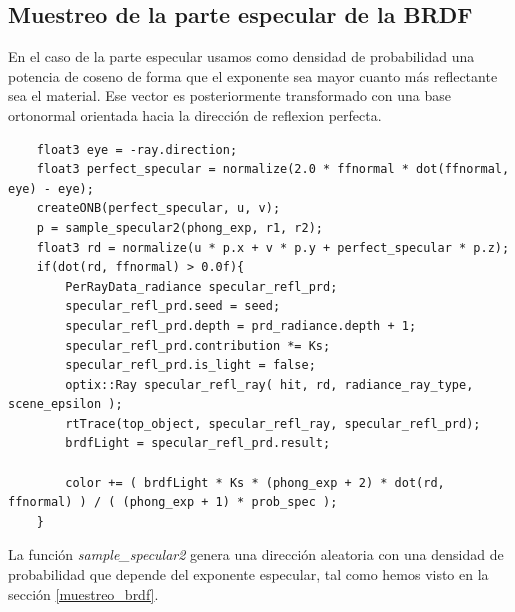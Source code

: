 \clearpage

\subsection{Muestreo de la parte especular de la BRDF}

En el caso de la parte especular usamos como densidad de probabilidad una potencia de coseno de forma que el exponente sea mayor cuanto más reflectante sea el material. Ese vector es posteriormente transformado con una base ortonormal orientada hacia la dirección de reflexion perfecta.

\begin{lstlisting}
	float3 eye = -ray.direction;
	float3 perfect_specular = normalize(2.0 * ffnormal * dot(ffnormal, eye) - eye);
	createONB(perfect_specular, u, v);
	p = sample_specular2(phong_exp, r1, r2);
	float3 rd = normalize(u * p.x + v * p.y + perfect_specular * p.z);
	if(dot(rd, ffnormal) > 0.0f){
		PerRayData_radiance specular_refl_prd;
		specular_refl_prd.seed = seed;
		specular_refl_prd.depth = prd_radiance.depth + 1;
		specular_refl_prd.contribution *= Ks;
		specular_refl_prd.is_light = false;
		optix::Ray specular_refl_ray( hit, rd, radiance_ray_type, scene_epsilon );
		rtTrace(top_object, specular_refl_ray, specular_refl_prd);
		brdfLight = specular_refl_prd.result;
				
		color += ( brdfLight * Ks * (phong_exp + 2) * dot(rd, ffnormal) ) / ( (phong_exp + 1) * prob_spec );
	}

\end{lstlisting}

La función \emph{sample\_specular2} genera una dirección aleatoria con una densidad de probabilidad que depende del exponente especular, tal como hemos visto en la sección \ref{muestreo_brdf}.

